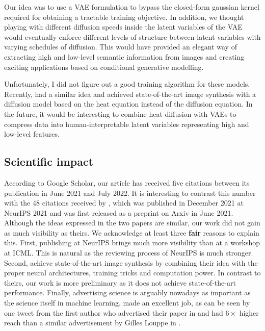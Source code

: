 Our idea was to use a VAE formulation to bypass the closed-form gaussian kernel required for obtaining a tractable training objective. In addition, we thought playing with different diffusion speeds inside the latent variables of the VAE would eventually enforce different levels of structure between latent variables with varying schedules of diffusion. This would have provided an elegant way of extracting high and low-level semantic information from images and creating exciting applications based on conditional generative modelling.

Unfortunately, I did not figure out a good training algorithm for these models. Recently, \citet{rissanen2022generative} had a similar idea and achieved state-of-the-art image synthesis with a diffusion model based on the heat equation instead of the diffusion equation. In the future, it would be interesting to combine heat diffusion with VAEs to compress data into human-interpretable latent variables representing high and low-level features.

\subsection{Scientific impact}

According to Google Scholar, our article has received five citations between its publication in June 2021 and July 2022. It is interesting to contrast this number with the 48 citations received by \citet{vahdat2021score}, which was published in December 2021 at NeurIPS 2021 and was first released as a preprint on Arxiv in June 2021. Although the ideas expressed in the two papers are similar, our work did not gain as much visibility as theirs. We acknowledge at least three \textbf{fair} reasons to explain this. First, publishing at NeurIPS brings much more visibility than at a workshop at ICML. This is natural as the reviewing process of NeurIPS is much stronger. Second, \citet{vahdat2021score} achieve state-of-the-art image synthesis by combining their idea with the proper neural architectures, training tricks and computation power.
In contrast to theirs, our work is more preliminary as it does not achieve state-of-the-art performance. Finally, advertising science is arguably nowadays as important as the science itself in machine learning.\citet{vahdat2021score} made an excellent job, as can be seen by one tweet from the first author who advertised their paper in  and had $6\times$ higher reach than a similar advertisement by Gilles Louppe in .


